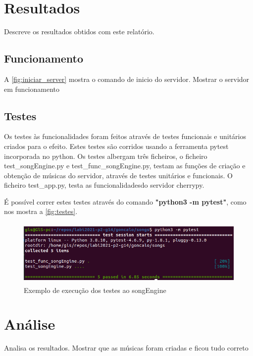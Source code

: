 \documentclass{report}
\begin{document}

\chapter{Resultados}
\label{chap.resultados}
Descreve os resultados obtidos com este relatório.

\section{Funcionamento}
\label{sec:funcionamento}

A \autoref{fig:iniciar_server} mostra o comando de inicio do servidor.
Mostrar o servidor em funcionamento

\section{Testes}
\label{sec:testes}

Os testes às funcionalidades foram feitos através de testes funcionais e unitários criados para 
o efeito. Estes testes são corridos usando a ferramenta pytest incorporada no python. 
Os testes albergam três ficheiros, o ficheiro test\_songEngine.py e test\_func\_songEngine.py, 
testam as funções de criação e obtenção de músicas do servidor, através de testes unitários e
funcionais. O ficheiro test\_app.py, testa as funcionalidadesdo servidor cherrypy.

É possível correr estes testes através do comando \textbf{"python3 -m pytest"}, como nos mostra 
a \autoref{fig:testes}.

\begin{figure}[ht]
\center 
\includegraphics[height=90pt]{img/pytest.png}
\caption{Exemplo de execução dos testes ao songEngine}
\label{fig:testes}
\end{figure}


\chapter{Análise}
\label{chap.analise}
Analisa os resultados.
Mostrar que as músicas foram criadas e ficou tudo correto
\end{document}
